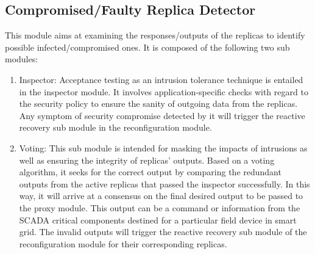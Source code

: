 \documentclass[preprint,number,12pt]{elsarticle}
\begin{document}
\subsection{Compromised/Faulty Replica Detector}
This module aims at examining the responses/outputs of the replicas to identify possible infected/compromised ones. It is composed of the following two sub modules:
\begin{enumerate}
\item Inspector: Acceptance testing as an intrusion tolerance technique is entailed
in the inspector module. It involves application-specific checks with regard to the security policy to ensure the sanity of outgoing data from the replicas. Any symptom of security compromise  detected by it will trigger the reactive recovery sub module in the reconfiguration module.
\item Voting: This sub module is intended for masking the impacts of intrusions as well as ensuring the integrity of replicas’ outputs. Based on a voting algorithm, it seeks for the correct output by comparing the redundant outputs from the active replicas that passed the inspector successfully. In this way, it will arrive at a consensus on the final desired output to be passed to the proxy module. This output can be a command or information from the SCADA critical components destined for a particular field device in smart grid. The invalid outputs will trigger the reactive recovery sub module of the reconfiguration module for their corresponding replicas.
\end{enumerate}
\end{document}
